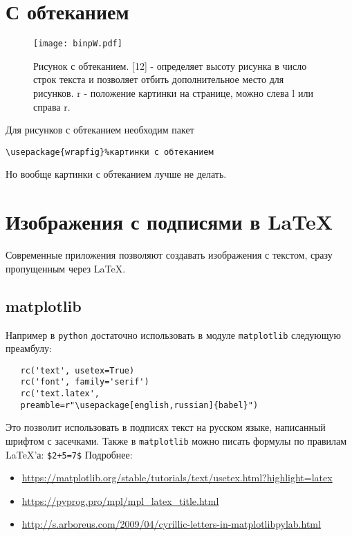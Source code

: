 \section{С обтеканием}
\lipsum[1-2]

\begin{wrapfigure}[12]{r}{0.45\linewidth} 

	\texttt{[image: binpW.pdf]}
	\caption{Рисунок с обтеканием. [12] - определяет высоту рисунка в число строк текста и позволяет отбить дополнительное место для рисунков. {r} - положение картинки на странице, можно слева {l} или справа {r}. 
	}
	\label{fig:image4}
\end{wrapfigure}


\lipsum[1-2]

Для рисунков с обтеканием необходим пакет

\verb|\usepackage{wrapfig}%картинки с обтеканием| 

Но вообще картинки с обтеканием лучше не делать.

\section{Изображения с подписями в \LaTeX}

Современные приложения позволяют создавать изображения с текстом, сразу пропущенным через \LaTeX. 

\subsection{matplotlib}
Например в \verb|python| достаточно использовать в модуле \verb|matplotlib| следующую преамбулу:


\begin{verbatim}
   rc('text', usetex=True)
   rc('font', family='serif')
   rc('text.latex', 
   preamble=r"\usepackage[english,russian]{babel}")
\end{verbatim}

Это позволит использовать в подписях текст на русском языке, написанный шрифтом с засечками. Также в \verb|matplotlib| можно писать формулы по правилам \LaTeX'а: \verb*|$2+5=7$|
Подробнее:
\begin{itemize}
	\item \href{https://matplotlib.org/stable/tutorials/text/usetex.html?highlight=latex}{https://matplotlib.org/stable/tutorials/text/usetex.html?highlight=latex}
	\item \href{https://pyprog.pro/mpl/mpl_latex_title.html}{https://pyprog.pro/mpl/mpl\_latex\_title.html}
	\item \href{http://s.arboreus.com/2009/04/cyrillic-letters-in-matplotlibpylab.html}{http://s.arboreus.com/2009/04/cyrillic-letters-in-matplotlibpylab.html}
\end{itemize}

